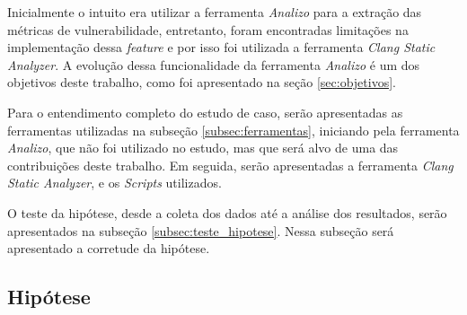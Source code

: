 Inicialmente o intuito era utilizar a ferramenta \emph{Analizo} para a extração
das métricas de vulnerabilidade, entretanto, foram encontradas limitações na
implementação dessa \textit{feature} e por isso foi utilizada a ferramenta
\emph{Clang Static Analyzer}. A evolução dessa funcionalidade da ferramenta
\emph{Analizo} é um dos objetivos deste trabalho, como foi apresentado na seção
\ref{sec:objetivos}.

Para o entendimento completo do estudo de caso, serão apresentadas as
ferramentas utilizadas na subseção \ref{subsec:ferramentas}, iniciando pela ferramenta \emph{Analizo}, que
não foi utilizado no estudo, mas que será alvo de uma das contribuições deste
trabalho. Em seguida, serão apresentadas a ferramenta \emph{Clang Static
Analyzer}, e os \textit{Scripts} utilizados.

O teste da hipótese, desde a coleta dos dados até a análise dos resultados, serão
apresentados na subseção \ref{subsec:teste_hipotese}. Nessa subseção será
apresentado a corretude da hipótese.

\subsection{Hipótese} \label{subsec:hipotese}


